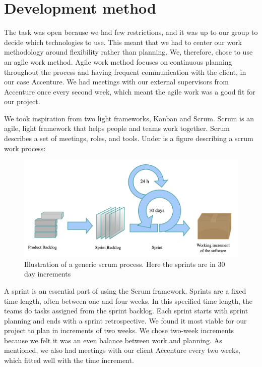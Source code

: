
\section{Development method}
The task was open because we had few restrictions, and it was up to our group to decide which technologies to use. This meant that we had to center our work methodology around flexibility rather than planning. We, therefore, chose to use an agile work method. Agile work method focuses on continuous planning throughout the process and having frequent communication with the client, in our case Accenture. We had meetings with our external supervisors from Accenture once every second week, which meant the agile work was a good fit for our project. 


We took inspiration from two light frameworks, Kanban and Scrum. Scrum is an agile,  light framework that helps people and teams work together. Scrum describes a set of meetings, roles, and tools. Under is a figure describing a scrum work process:

\begin{figure}[h!]
	\centering
	\includegraphics[width=1\linewidth]{figures/scrum_process}
	\caption[scrum process]{Illustration of a generic scrum process. Here the sprints are in 30 day increments}
	\label{fig:scrumprocess}
\end{figure}


A sprint is an essential part of using the Scrum framework. Sprints are a fixed time length, often between one and four weeks. In this specified time length, the teams do tasks assigned from the sprint backlog. Each sprint starts with sprint planning and ends with a sprint retrospective. We found it most viable for our project to plan in increments of two weeks. We chose two-week increments because we felt it was an even balance between work and planning. As mentioned, we also had meetings with our client Accenture every two weeks, which fitted well with the time increment.   

